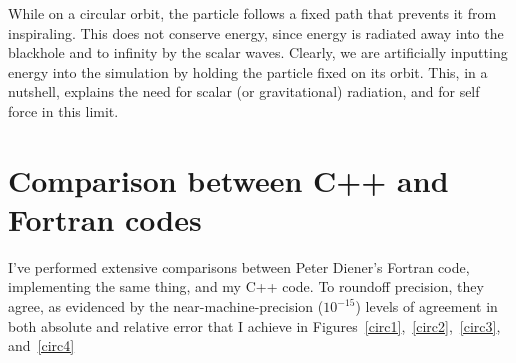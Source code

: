 While on a circular orbit, the particle follows a fixed path that prevents it from inspiraling. This does not conserve energy, since energy is radiated away into the blackhole and to infinity by the scalar waves. Clearly, we are artificially inputting energy into the simulation by holding the particle fixed on its orbit. This, in a nutshell, explains the need for scalar (or gravitational) radiation, and for self force in this limit. 


\section{Comparison between C++ and Fortran codes}

I've performed extensive comparisons between Peter Diener's Fortran code, implementing the same thing, and my C++ code. To roundoff precision, they agree, as evidenced by the near-machine-precision ($10^{-15}$) levels of agreement in both absolute and relative error that I achieve in Figures~\ref{circ1},~\ref{circ2},~\ref{circ3}, and~\ref{circ4}

